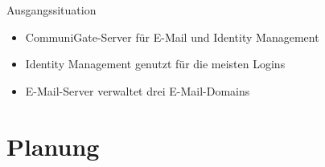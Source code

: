 \documentclass[presentation,svgnames,12pt]{beamer}
\begin{document}
\begin{frame}{Ausgangssituation}
\begin{itemize}
	\item CommuniGate-Server für E-Mail und Identity Management
	\item Identity Management genutzt für die meisten Logins
	\item E-Mail-Server verwaltet drei E-Mail-Domains%
\end{itemize}
\end{frame}


\section{Planung}
\subsection{}
\end{document}
